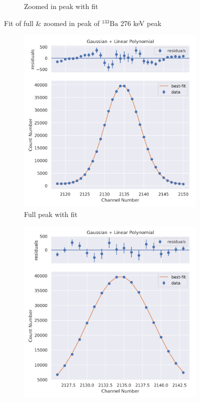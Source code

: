 \documentclass[11pt,a4paper]{article}
\newcommand{\element}[2]{$^{#2}\textrm{#1}$}
\begin{document}
\begin{figure}[H]
\begin{subfigure}{.5\linewidth}
    \caption{Zoomed in peak with fit}
  \end{subfigure}
  \caption{Fit of full \& zoomed in peak of \element{Ba}{133} 276 keV peak}
\end{figure}
\begin{figure}[H]
  \centering
  \begin{subfigure}{.5\linewidth}
    \centering
    \includegraphics[width=\linewidth]{./Images/Barium133/Linear/Linear_5_Full.png}
    \caption{Full peak with fit}
  \end{subfigure}%
  \begin{subfigure}{.5\linewidth}
    \centering
    \includegraphics[width=\linewidth]{./Images/Barium133/Linear/Linear_5_Zoom.png}

\end{subfigure}
\end{figure}
\end{document}
